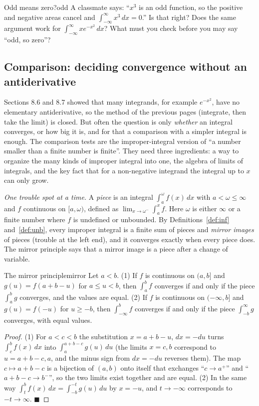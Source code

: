 \documentclass[11pt]{article}
\begin{document}
\begin{think}{Odd means zero?}{odd}
A classmate says: ``$x^3$ is an odd function, so the positive and negative areas cancel and $\int_{-\infty}^\infty x^3\,dx=0$.'' Is that right? Does the same argument work for $\int_{-\infty}^\infty xe^{-x^2}\,dx$? What must you check before you may say ``odd, so zero''?
\end{think}

\subsection*{Comparison: deciding convergence without an antiderivative}

Sections 8.6 and 8.7 showed that many integrands, for example $e^{-x^2}$, have no elementary antiderivative, so the method of the previous pages (integrate, then take the limit) is closed. But often the question is only \emph{whether} an integral converges, or how big it is, and for that a comparison with a simpler integral is enough. The comparison tests are the improper-integral version of ``a number smaller than a finite number is finite''. They need three ingredients: a way to organize the many kinds of improper integral into one, the algebra of limits of integrals, and the key fact that for a non-negative integrand the integral up to $x$ can only grow.

\emph{One trouble spot at a time.} A \emph{piece} is an integral $\int_a^\omega f(x)\,dx$ with $a<\omega\le\infty$ and $f$ continuous on $[a,\omega)$, defined as $\lim_{x\to\omega^-}\int_a^xf$. Here $\omega$ is either $\infty$ or a finite number where $f$ is undefined or unbounded. By Definitions~\ref{def:inf} and~\ref{def:unb}, every improper integral is a finite sum of pieces and \emph{mirror images} of pieces (trouble at the left end), and it converges exactly when every piece does. The mirror principle says that a mirror image is a piece after a change of variable.

\begin{thm}{The mirror principle}{mirror}
Let $a<b$. (1) If $f$ is continuous on $(a,b]$ and $g(u)=f(a+b-u)$ for $a\le u<b$, then $\int_a^bf$ converges if and only if the piece $\int_a^bg$ converges, and the values are equal. (2) If $f$ is continuous on $(-\infty,b]$ and $g(u)=f(-u)$ for $u\ge-b$, then $\int_{-\infty}^bf$ converges if and only if the piece $\int_{-b}^\infty g$ converges, with equal values.
\end{thm}
\begin{proof}
(1) For $a<c<b$ the substitution $x=a+b-u$, $dx=-du$ turns $\int_c^bf(x)\,dx$ into $\int_a^{a+b-c}g(u)\,du$ (the limits $x=c,b$ correspond to $u=a+b-c,a$, and the minus sign from $dx=-du$ reverses them). The map $c\mapsto a+b-c$ is a bijection of $(a,b)$ onto itself that exchanges ``$c\to a^+$'' and ``$a+b-c\to b^-$'', so the two limits exist together and are equal. (2) In the same way $\int_t^bf(x)\,dx=\int_{-b}^{-t}g(u)\,du$ by $x=-u$, and $t\to-\infty$ corresponds to $-t\to\infty$. $\blacksquare$
\end{proof}
\end{document}
